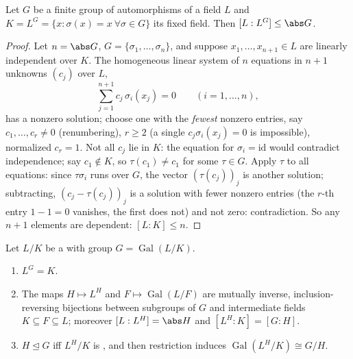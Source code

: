 \begin{lemma}[Artin]\label{lem:b3:galois:artin}
Let $G$ be a finite group of automorphisms of a field $L$ and
$K = L^G = \{x : \sigma(x) = x\ \forall\sigma \in G\}$ its fixed
field. Then $[L : L^G] \leq \abs G$.
\end{lemma}

\begin{proof}
Let $n = \abs G$, $G = \{\sigma_1, \dots, \sigma_n\}$, and
suppose $x_1, \dots, x_{n+1} \in L$ are linearly independent over
$K$. The homogeneous linear system of $n$ equations in $n+1$
unknowns $(c_j)$ over $L$,
\[
\sum_{j=1}^{n+1} c_j\,\sigma_i(x_j) = 0
\qquad (i = 1, \dots, n),
\]
has a nonzero solution; choose one with the \emph{fewest} nonzero
entries, say $c_1, \dots, c_r \neq 0$ (renumbering), $r \geq 2$
(a single $c_j\sigma_i(x_j) = 0$ is impossible), normalized
$c_r = 1$. Not all $c_j$ lie in $K$: the equation for $\sigma_i =
\mathrm{id}$ would contradict independence; say $c_1 \notin K$,
so $\tau(c_1) \ne c_1$ for some $\tau \in G$. Apply $\tau$ to all
equations: since $\tau\sigma_i$ runs over $G$, the vector
$(\tau(c_j))_j$ is another solution; subtracting, $(c_j -
\tau(c_j))_j$ is a solution with fewer nonzero entries (the
$r$-th entry $1 - 1 = 0$ vanishes, the first does not) and not
zero: contradiction. So any $n+1$ elements are dependent: $[L:K]
\leq n$.
\end{proof}

\begin{theorem}
\label{thm:b3:galois:fundamental}
Let $L/K$ be a  with group $G =
\operatorname{Gal}(L/K)$.
\begin{enumerate}
  \item $L^G = K$.
  \item The maps $H \mapsto L^H$ and $F \mapsto
        \operatorname{Gal}(L/F)$ are mutually inverse,
        inclusion-reversing bijections between subgroups of $G$
        and intermediate fields $K \subseteq F \subseteq L$;
        moreover $[L : L^H] = \abs H$ and $[L^H : K] = [G : H]$.
  \item $H \trianglelefteq G$ iff $L^H/K$ is , and then
        restriction induces $\operatorname{Gal}(L^H/K) \cong
        G/H$.
\end{enumerate}
\end{theorem}


